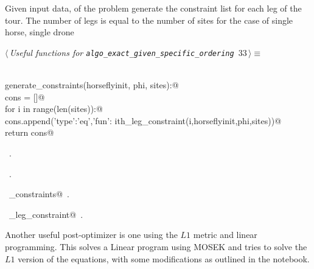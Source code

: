 \documentclass[11.5pt]{report}
\begin{document}
\vspace{-0.8cm} \newchunk Given input data, of the problem generate the constraint list for each leg 
of the tour. The number of legs is equal to the number of sites for the case of single horse, single drone
\begin{flushleft} \small\label{scrap44}\raggedright\small
{} $\langle\,${\itshape Useful functions for \verb|algo_exact_given_specific_ordering|}\nobreak\ {\footnotesize {33}}$\,\rangle\equiv$
\vspace{-1ex}
\begin{list}{}{} \item
\mbox{}\verb@@\\
\mbox{}\verb@def generate_constraints(horseflyinit, phi, sites):@\\
\mbox{}\verb@   cons = []@\\
\mbox{}\verb@   for i in range(len(sites)):@\\
\mbox{}\verb@        cons.append({'type':'eq','fun': ith_leg_constraint(i,horseflyinit,phi,sites)})@\\
\mbox{}\verb@   return cons@\\
\mbox{}\verb@@{\NWsep}
\end{list}
\vspace{-1.5ex}
\footnotesize
\begin{list}{}{\setlength{\itemsep}{-\parsep}\setlength{\itemindent}{-\leftmargin}}
\item \NWtxtMacroDefBy\ .
\item \NWtxtMacroRefIn\ .
\item \NWtxtIdentsDefed\nobreak\  \verb@generate_constraints@\nobreak\ .\item \NWtxtIdentsUsed\nobreak\  \verb@ith_leg_constraint@\nobreak\ .
\item{}
\end{list}
\vspace{4ex}
\end{flushleft}




\vspace{-0.8cm} \newchunk Another useful post-optimizer is one using the $L1$ metric and linear programming. 
This solves a Linear program using MOSEK and tries to solve the 
$L1$ version of the equations, with some modifications as outlined
    in the notebook.
\end{document}
